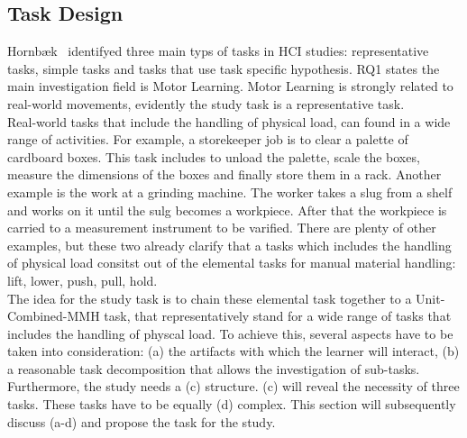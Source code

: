 \subsection{Task Design}
Hornb\ae{}k~\cite{hornbaek} identifyed three main typs of tasks in HCI studies: representative tasks, simple tasks and tasks that use task specific hypothesis. RQ1 states the main investigation field is Motor Learning. Motor Learning is strongly related to real-world movements, evidently the study task is a representative task.\\
Real-world tasks that include the handling of physical load, can found in a wide range of activities. For example, a storekeeper job is to clear a palette of cardboard boxes. This task includes to unload the palette, scale the boxes, measure the dimensions of the boxes and finally store them in a rack. Another example is the work at a grinding machine. The worker takes a slug from a shelf and works on it until the sulg becomes a workpiece.  After that the workpiece is carried to a measurement instrument to be varified. There are plenty of other examples, but these two already clarify that a tasks which includes the handling of physical load consitst out of the elemental tasks for manual material handling: lift, lower, push, pull, hold.\\
The idea for the study task is to chain these elemental task together to a Unit-Combined-MMH task, that representatively stand for a wide range of tasks that includes the handling of physcal load. To achieve this, several aspects have to be taken into consideration: (a) the artifacts with which the learner will interact, (b) a reasonable task decomposition that allows the investigation of sub-tasks. Furthermore, the study needs a (c) structure. (c) will reveal the necessity of three tasks. These tasks have to be equally (d) complex. This section will subsequently discuss (a-d) and propose the task for the study.

